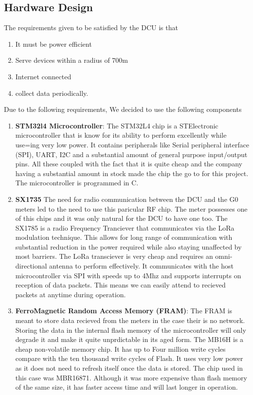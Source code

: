 \subsection{Hardware Design}
The requirements given to be satisfied by the DCU is that
\begin{enumerate}
\item It must be power efficient
\item Serve devices within a radius of 700m
\item Internet connected
\item collect data periodically.
\end{enumerate}
  
Due to the following requirements, We decided to use the following components
\begin{enumerate}
\item \textbf{STM32l4 Microcontroller}: The STM32L4 chip is a STElectronic microcontroller that is know for its ability to perform excellently while use=ing very low power. It contains peripherals like Serial peripheral interface (SPI), UART, I2C and a substantial amount of general purpose input/output pins. All these coupled with the fact that it is quite cheap and the company having a substantial amount in stock made the chip the go to for this project. The microcontroller is programmed in C.
\item \textbf{SX1735} The need for radio communication between the DCU and the G0 meters led to the need to use this paricular RF chip. The meter possesses one of this chips and it was only natural for the DCU to have one too. The SX1785 is a radio Frequency Tranciever that communicates via the LoRa modulation technique. This allows for long range of communication with substantial reduction in the power required while also staying unaffected by most barriers.  The LoRa transciever is very cheap and requires an omni-directional antenna to perform effectively. It communicates with the host microcontroller via SPI with speeds up to 4Mhz and supports interrupts on reception of data packets. This means we can easily attend to recieved packets at anytime during operation.

\item \textbf{FerroMagnetic Random Access Memory (FRAM)}: The FRAM is meant to store data recieved from the meters in the case their is no network. Storing the data in the internal flash memory of the microcontroller will only degrade it and make it quite unprdictable in its aged form. The MB16H is a cheap non-volatile memory chip. It has up to Four million write cycles compare with the ten thousand write cycles of Flash. It uses very low power as it does not need to refresh itself once the data is stored. The chip used in this case was MBR16871. Although it was more expensive than flash memory of the same size, it has faster access time and will last longer in operation. 


\end{enumerate}
